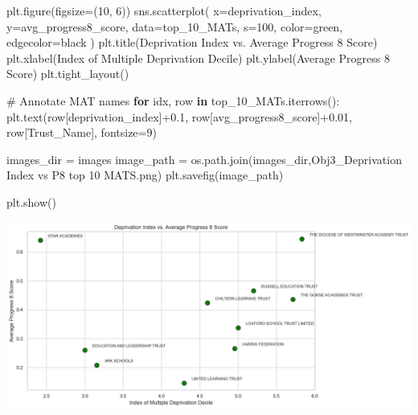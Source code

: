 \documentclass[
  letterpaper,
  DIV=11,
  numbers=noendperiod]{scrartcl}
\newenvironment{Shaded}{\begin{snugshade}}{\end{snugshade}}
\newcommand{\CommentTok}[1]{\textcolor[rgb]{0.37,0.37,0.37}{#1}}
\newcommand{\ControlFlowTok}[1]{\textcolor[rgb]{0.00,0.23,0.31}{\textbf{#1}}}
\newcommand{\DecValTok}[1]{\textcolor[rgb]{0.68,0.00,0.00}{#1}}
\newcommand{\FloatTok}[1]{\textcolor[rgb]{0.68,0.00,0.00}{#1}}
\newcommand{\KeywordTok}[1]{\textcolor[rgb]{0.00,0.23,0.31}{\textbf{#1}}}
\newcommand{\NormalTok}[1]{\textcolor[rgb]{0.00,0.23,0.31}{#1}}
\newcommand{\OperatorTok}[1]{\textcolor[rgb]{0.37,0.37,0.37}{#1}}
\newcommand{\StringTok}[1]{\textcolor[rgb]{0.13,0.47,0.30}{#1}}
\begin{document}
\begin{Shaded}
\begin{Highlighting}[]
\NormalTok{plt.figure(figsize}\OperatorTok{=}\NormalTok{(}\DecValTok{10}\NormalTok{, }\DecValTok{6}\NormalTok{))}
\NormalTok{sns.scatterplot(}
\NormalTok{    x}\OperatorTok{=}\StringTok{\textquotesingle{}deprivation\_index\textquotesingle{}}\NormalTok{, }
\NormalTok{    y}\OperatorTok{=}\StringTok{\textquotesingle{}avg\_progress8\_score\textquotesingle{}}\NormalTok{, }
\NormalTok{    data}\OperatorTok{=}\NormalTok{top\_10\_MATs,}
\NormalTok{    s}\OperatorTok{=}\DecValTok{100}\NormalTok{,}
\NormalTok{    color}\OperatorTok{=}\StringTok{\textquotesingle{}green\textquotesingle{}}\NormalTok{,}
\NormalTok{    edgecolor}\OperatorTok{=}\StringTok{\textquotesingle{}black\textquotesingle{}}
\NormalTok{)}
\NormalTok{plt.title(}\StringTok{\textquotesingle{}Deprivation Index vs. Average Progress 8 Score\textquotesingle{}}\NormalTok{)}
\NormalTok{plt.xlabel(}\StringTok{\textquotesingle{}Index of Multiple Deprivation Decile\textquotesingle{}}\NormalTok{)}
\NormalTok{plt.ylabel(}\StringTok{\textquotesingle{}Average Progress 8 Score\textquotesingle{}}\NormalTok{)}
\NormalTok{plt.tight\_layout()}


\CommentTok{\# Annotate MAT names}
\ControlFlowTok{for}\NormalTok{ idx, row }\KeywordTok{in}\NormalTok{ top\_10\_MATs.iterrows():}
\NormalTok{    plt.text(row[}\StringTok{\textquotesingle{}deprivation\_index\textquotesingle{}}\NormalTok{]}\OperatorTok{+}\FloatTok{0.1}\NormalTok{, row[}\StringTok{\textquotesingle{}avg\_progress8\_score\textquotesingle{}}\NormalTok{]}\OperatorTok{+}\FloatTok{0.01}\NormalTok{, }
\NormalTok{             row[}\StringTok{\textquotesingle{}Trust\_Name\textquotesingle{}}\NormalTok{], fontsize}\OperatorTok{=}\DecValTok{9}\NormalTok{)}

\NormalTok{images\_dir }\OperatorTok{=} \StringTok{\textquotesingle{}images\textquotesingle{}}
\NormalTok{image\_path }\OperatorTok{=}\NormalTok{ os.path.join(images\_dir,}\StringTok{\textquotesingle{}Obj3\_Deprivation Index vs P8 top 10 MATS.png\textquotesingle{}}\NormalTok{)}
\NormalTok{plt.savefig(image\_path)}

\NormalTok{plt.show()}
\end{Highlighting}
\end{Shaded}

\includegraphics{P4DS_A2_Data_Analysis_Project_files/figure-pdf/cell-101-output-1.png}
\end{document}
